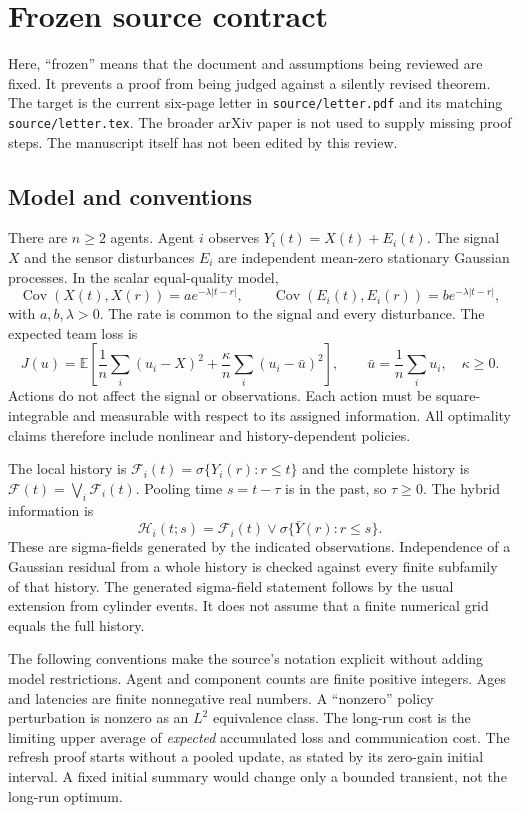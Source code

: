 \documentclass[11pt,letterpaper]{article}
\newcommand{\E}{\mathbb E}
\newcommand{\Cov}{\operatorname{Cov}}
\newcommand{\F}{\mathcal F}
\newcommand{\HH}{\mathcal H}
\begin{document}
\section{Frozen source contract}
Here, ``frozen'' means that the document and assumptions being reviewed are fixed. It prevents a proof from being judged against a silently revised theorem. The target is the current six-page letter in \texttt{source/letter.pdf} and its matching \texttt{source/letter.tex}. The broader arXiv paper is not used to supply missing proof steps. The manuscript itself has not been edited by this review.

\subsection{Model and conventions}
There are $n\ge2$ agents. Agent $i$ observes $Y_i(t)=X(t)+E_i(t)$. The signal $X$ and the sensor disturbances $E_i$ are independent mean-zero stationary Gaussian processes. In the scalar equal-quality model,
\[
\Cov(X(t),X(r))=a e^{-\lambda|t-r|},\qquad
\Cov(E_i(t),E_i(r))=b e^{-\lambda|t-r|},
\]
with $a,b,\lambda>0$. The rate is common to the signal and every disturbance. The expected team loss is
\begin{equation}
J(u)=\E\left[\frac1n\sum_i(u_i-X)^2+
\frac\kappa n\sum_i(u_i-\bar u)^2\right],\qquad
\bar u=\frac1n\sum_i u_i,\quad\kappa\ge0.
\tag{A1}
\end{equation}
Actions do not affect the signal or observations. Each action must be square-integrable and measurable with respect to its assigned information. All optimality claims therefore include nonlinear and history-dependent policies.

The local history is $\F_i(t)=\sigma\{Y_i(r):r\le t\}$ and the complete history is $\F(t)=\bigvee_i\F_i(t)$. Pooling time $s=t-\tau$ is in the past, so $\tau\ge0$. The hybrid information is
\[
\HH_i(t;s)=\F_i(t)\vee\sigma\{\bar Y(r):r\le s\}.
\]
These are sigma-fields generated by the indicated observations. Independence of a Gaussian residual from a whole history is checked against every finite subfamily of that history. The generated sigma-field statement follows by the usual extension from cylinder events. It does not assume that a finite numerical grid equals the full history.

The following conventions make the source's notation explicit without adding model restrictions. Agent and component counts are finite positive integers. Ages and latencies are finite nonnegative real numbers. A ``nonzero'' policy perturbation is nonzero as an $L^2$ equivalence class. The long-run cost is the limiting upper average of \emph{expected} accumulated loss and communication cost. The refresh proof starts without a pooled update, as stated by its zero-gain initial interval. A fixed initial summary would change only a bounded transient, not the long-run optimum.
\end{document}
